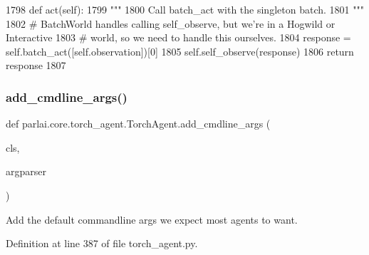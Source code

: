 \begin{DoxyCode}
1798     \textcolor{keyword}{def }act(self):
1799         \textcolor{stringliteral}{"""}
1800 \textcolor{stringliteral}{        Call batch\_act with the singleton batch.}
1801 \textcolor{stringliteral}{        """}
1802         \textcolor{comment}{# BatchWorld handles calling self\_observe, but we're in a Hogwild or Interactive}
1803         \textcolor{comment}{# world, so we need to handle this ourselves.}
1804         response = self.batch\_act([self.observation])[0]
1805         self.self\_observe(response)
1806         \textcolor{keywordflow}{return} response
1807 
\end{DoxyCode}
\mbox{\label{classparlai_1_1core_1_1torch__agent_1_1TorchAgent_a4a72bdd07d2cb5ce402d0058140cad0d}} 
\subsubsection{\texorpdfstring{add\+\_\+cmdline\+\_\+args()}{add\_cmdline\_args()}}
{\footnotesize\ttfamily def parlai.\+core.\+torch\+\_\+agent.\+Torch\+Agent.\+add\+\_\+cmdline\+\_\+args (\begin{DoxyParamCaption}\item[{}]{cls,  }\item[{}]{argparser }\end{DoxyParamCaption})}

\begin{DoxyVerb}Add the default commandline args we expect most agents to want.
\end{DoxyVerb}
 

Definition at line 387 of file torch\+\_\+agent.\+py.


